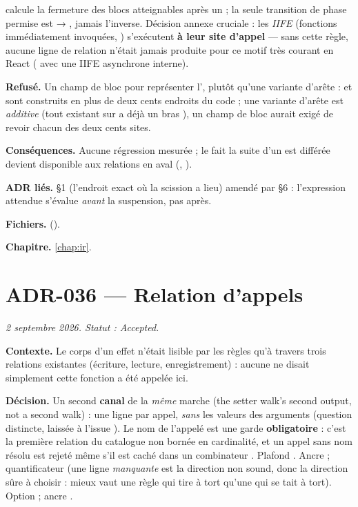 
 calcule la fermeture des blocs atteignables après un
 ; la seule transition de phase permise est  →
, jamais l'inverse. Décision annexe cruciale : les \emph{IIFE}
(fonctions immédiatement invoquées, )
s'exécutent \textbf{à leur site d'appel} --- sans cette règle, aucune ligne de
relation n'était jamais produite pour ce motif très courant en React
( avec une IIFE asynchrone interne).

\textbf{Refusé.} Un champ de bloc pour représenter l', plutôt
qu'une variante d'arête :  et  sont construits en
plus de deux cents endroits du code ; une variante d'arête est
\emph{additive} (tout  existant sur  a déjà un bras
\code{_}), un champ de bloc aurait exigé de revoir chacun des deux cents
sites.

\textbf{Conséquences.} Aucune régression mesurée ; le fait \og la suite d'un
 est différée\fg{} devient disponible aux relations en aval
(, ).

\textbf{ADR liés.} §1 (l'endroit exact où la scission a lieu) amendé par
 §6 : l'expression attendue s'évalue \emph{avant} la suspension, pas
après.

\textbf{Fichiers.}  ().

\textbf{Chapitre.} \cref{chap:ir}.

\section{ADR-036 --- Relation d'appels}
\label{adr:36}
\noindent\textit{2 septembre 2026. Statut : Accepted.}

\textbf{Contexte.} Le corps d'un effet n'était lisible par les règles qu'à
travers trois relations existantes (écriture, lecture, enregistrement) :
aucune ne disait simplement \og cette fonction a été appelée ici\fg{}.

\textbf{Décision.} Un second \textbf{canal} de la \emph{même} marche
(\og the setter walk's second output, not a second walk\fg{}) : une ligne
 par appel, \emph{sans} les valeurs des
arguments (question distincte, laissée à l'issue ). Le nom de
l'appelé est une garde \textbf{obligatoire} : c'est la première relation du
catalogue non bornée en cardinalité, et un appel sans nom résolu est rejeté
même s'il est caché dans un combinateur . Plafond \Warning{}.
Ancre  ; quantificateur  (une ligne
\emph{manquante} est la direction non sound, donc la direction sûre à
choisir : mieux vaut une règle qui tire à tort qu'une qui se tait à tort).
Option  ; ancre .

